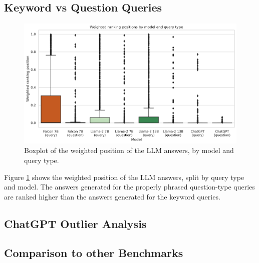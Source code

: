 \subsection{Keyword vs Question Queries}
\begin{figure}
    \centering
    \includegraphics[width=\textwidth]{images/weighted_position_boxplot_by_model_and_question.png}
    \caption{Boxplot of the weighted position of the LLM answers, by model and query type.}
    \label{fig:weighted_position_boxplot_by_model_and_question}
\end{figure}
Figure \ref{fig:weighted_position_boxplot_by_model_and_question} shows the weighted position of the LLM answers, split by query type and model.
The answers generated for the properly phrased question-type queries are ranked higher than the answers generated for the keyword queries.

\subsection{ChatGPT Outlier Analysis}





\subsection{Comparison to other Benchmarks}